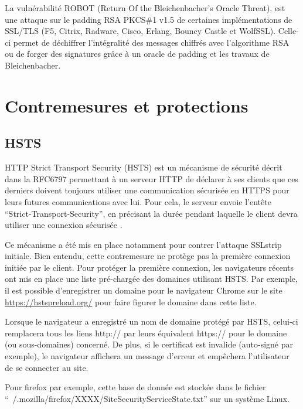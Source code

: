 \vspace{1em}

La vulnérabilité ROBOT (Return Of the Bleichenbacher's Oracle Threat), est une attaque sur le padding RSA PKCS\#1 v1.5 de certaines implémentations de SSL/TLS (F5, Citrix, Radware, Cisco, Erlang, Bouncy Castle et WolfSSL). Celle-ci permet de déchiffrer l'intégralité des messages chiffrés avec l'algorithme RSA ou de forger des signatures grâce à un oracle de padding et les travaux de Bleichenbacher\cite{robot}.


\section{Contremesures et protections}

\subsection{HSTS}

\label{sec:hsts}

HTTP Strict Transport Security (HSTS) est un mécanisme de sécurité décrit dans la RFC6797 permettant à un serveur HTTP de déclarer à ses clients que ces derniers doivent toujours utiliser une communication sécurisée en HTTPS pour leurs futures communications avec lui. Pour cela, le serveur envoie l'entête ``Strict-Transport-Security'', en précisant la durée pendant laquelle le client devra utiliser une connexion sécurisée \cite{hsts}.

Ce mécanisme a été mis en place notamment pour contrer l'attaque SSLstrip initiale. Bien entendu, cette contremesure ne protège pas la première connexion initiée par le client. Pour protéger la première connexion, les navigateurs récents ont mis en place une liste pré-chargée des domaines utilisant HSTS. Par exemple, il est possible d'enregistrer un domaine pour le navigateur Chrome sur le site \url{https://hstspreload.org/} pour faire figurer le domaine dans cette liste.

Lorsque le navigateur a enregistré un nom de domaine protégé par HSTS, celui-ci remplacera tous les liens http:// par leurs équivalent https:// pour le domaine (ou sous-domaines) concerné. De plus, si le certificat est invalide (auto-signé par exemple), le navigateur affichera un message d'erreur et empêchera l'utilisateur de se connecter au site.

Pour firefox par exemple, cette base de donnée est stockée dans le fichier ``~/.mozilla/firefox/XXXX/SiteSecurityServiceState.txt'' sur un système Linux.

